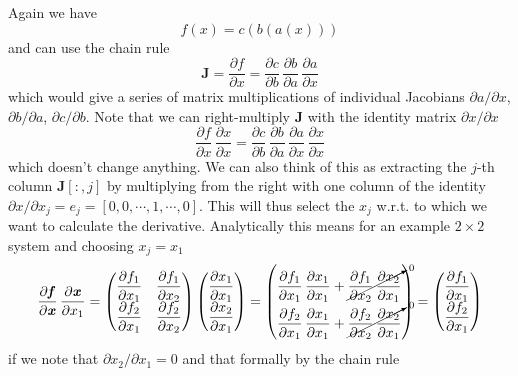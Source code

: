 \documentclass[parskip,paper=a4,11pt,headsepline]{scrartcl}
\newcommand{\ve}[1]{\ensuremath{\bm{\mathit{#1}}}}
\newcommand{\ma}[1]{\ensuremath{\bm{\mathbf{#1}}}}
\newcommand{\pd}[2]{\dfrac{\partial #1}{\partial #2}}
\newcommand{\pdi}[2]{\partial #1/\partial #2}
\begin{document}
Again we have
\begin{equation*}
    \ve f(\ve x) = \ve c(\ve b(\ve a(\ve x)))
\end{equation*}
and can use the chain rule
\begin{equation*}
    \ma J=\pd{\ve f}{\ve x} = \pd{\ve c}{\ve b}\,\pd{\ve b}{\ve a}\,\pd{\ve a}{\ve x}
\end{equation*}
which would give a series of matrix multiplications of individual Jacobians $\pdi{\ve
a}{\ve x}$, $\pdi{\ve b}{\ve a}$, $\pdi{\ve c}{\ve b}$.
Note that we can right-multiply $\ma J$ with the identity
matrix $\pdi{\ve x}{\ve x}$
\begin{equation*}
    \pd{\ve f}{\ve x}\,\pd{\ve x}{\ve x} =
    \pd{\ve c}{\ve b}\,\pd{\ve b}{\ve a}\,\pd{\ve a}{\ve x}\,\pd{\ve x}{\ve x}
\end{equation*}
which doesn't change anything. We can also think of this as extracting the
$j$-th column $\ma J[:,j]$ by multiplying from the right with one column of the
identity $\partial\ve x/\partial x_j = \ve e_j = [0,0,\cdots,1,\cdots, 0]$.
This will thus select the $x_j$ w.r.t. to which we want to calculate the
derivative. Analytically this means for an example $2\times 2$ system and choosing
$x_j = x_1$
\begin{equation*}
    \pd{\ve f}{\ve x}\,\pd{\ve x}{x_1}=
    \begin{pmatrix}
        \pd{f_1}{x_1} & \pd{f_1}{x_2} \\
        \pd{f_2}{x_1} & \pd{f_2}{x_2} \\
    \end{pmatrix}
    \begin{pmatrix}
        \pd{x_1}{x_1} \\
        \pd{x_2}{x_1} \\
    \end{pmatrix}
    =
    \begin{pmatrix}
        \pd{f_1}{x_1}\,\pd{x_1}{x_1} + \cancelto{0}{\pd{f_1}{x_2}\,\pd{x_2}{x_1}} \\
        \pd{f_2}{x_1}\,\pd{x_1}{x_1} + \cancelto{0}{\pd{f_2}{x_2}\,\pd{x_2}{x_1}} \\
    \end{pmatrix}
    =
    \begin{pmatrix}
        \pd{f_1}{x_1} \\
        \pd{f_2}{x_1} \\
    \end{pmatrix}
\end{equation*}
if we note that $\pdi{x_2}{x_1}=0$ and that formally by the chain rule
\end{document}
